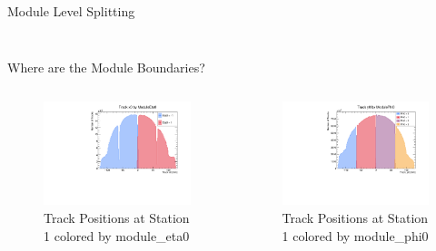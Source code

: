 \begin{frame}{Module Level Splitting}
\begin{columns}
\begin{column}{0.2\linewidth}
\begin{figure}
            \end{figure}
        \end{column}
    \end{columns}
\end{frame}

\begin{frame}{Where are the Module Boundaries?}
    \begin{columns}
        \begin{column}{0.5 \linewidth}
            \begin{figure}
                \includegraphics[width=\linewidth]{./ModuleLevelPlots/Track_x0_eta0.pdf}
                \caption{Track Positions at Station 1 colored by module\_eta0}
            \end{figure}
        \end{column}
        \begin{column}{0.5 \linewidth}
            \begin{figure}
                \includegraphics[width=\linewidth]{./ModuleLevelPlots/Track_y0_phi0.pdf}
                \caption{Track Positions at Station 1 colored by module\_phi0}
            \end{figure}
        \end{column}
     \end{columns}
\end{frame}




